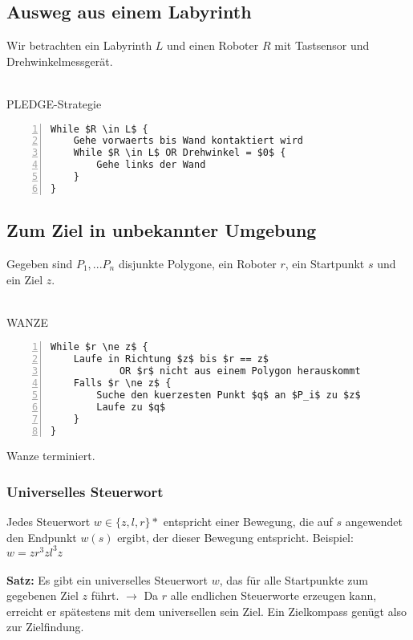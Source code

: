 \subsection{Ausweg aus einem Labyrinth}
Wir betrachten ein Labyrinth \(L\) und einen Roboter \(R\) mit Tastsensor und Drehwinkelmessgerät.
\\\\
\begin{minipage}{\textwidth}
PLEDGE-Strategie
\begin{lstlisting}[frame=single,numbers=left,mathescape]
While $R \in L$ {
	Gehe vorwaerts bis Wand kontaktiert wird
	While $R \in L$ OR Drehwinkel = $0$ {
		Gehe links der Wand
	}
}
\end{lstlisting}
\end{minipage}


\subsection{Zum Ziel in unbekannter Umgebung}
Gegeben sind \(P_1,...P_n\) disjunkte Polygone, ein Roboter \(r\), ein Startpunkt \(s\) und ein Ziel \(z\).
\\\\
\begin{minipage}{\textwidth}
WANZE
\begin{lstlisting}[frame=single,numbers=left,mathescape]
While $r \ne z$ {
	Laufe in Richtung $z$ bis $r == z$
			OR $r$ nicht aus einem Polygon herauskommt
	Falls $r \ne z$ {
		Suche den kuerzesten Punkt $q$ an $P_i$ zu $z$
		Laufe zu $q$
	}
}
\end{lstlisting}
\end{minipage}
Wanze terminiert.

\subsubsection{Universelles Steuerwort}
Jedes Steuerwort \(w \in \{z,l,r\}*\) entspricht einer Bewegung, die auf \(s\) angewendet den Endpunkt \(w(s)\) ergibt, der dieser Bewegung entspricht. Beispiel: \(w = zr^3zl^3z\)
\\\\
\textbf{Satz:} Es gibt ein universelles Steuerwort \(w\), das für alle Startpunkte zum gegebenen Ziel \(z\) führt. \(\rightarrow \) Da \(r\) alle endlichen Steuerworte erzeugen kann, erreicht er spätestens mit dem universellen sein Ziel. Ein Zielkompass genügt also zur Zielfindung.


